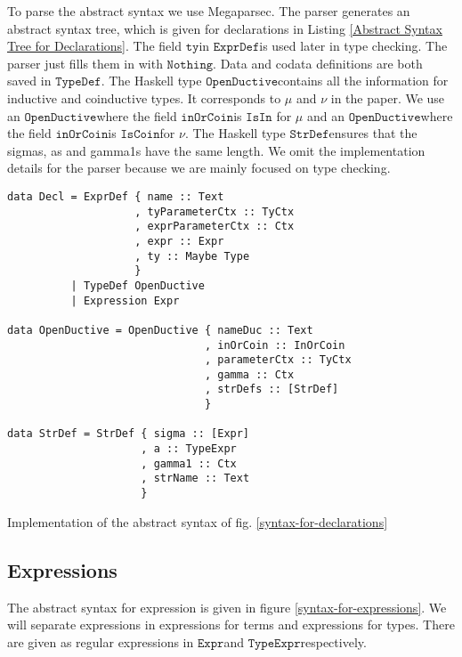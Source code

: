 \documentclass[a4paper,cleardoubleempty,BCOR1cm]{scrbook}
\begin{document}
To parse the abstract syntax we use Megaparsec. The parser generates an
abstract syntax tree, which is given for declarations in Listing
\ref{Abstract Syntax Tree for Declarations}. The field $\mathtt{ty}$\;in $\mathtt{ExprDef}$\;is used later in
type checking. The parser just fills them in with $\mathtt{Nothing}$. Data and codata
definitions are both saved in $\mathtt{TypeDef}$. The Haskell type $\mathtt{OpenDuctive}$\;contains all the
information for inductive and coinductive types. It corresponds to \(\mu\) and
\(\nu\) in the paper. We use an $\mathtt{OpenDuctive}$\;where the field $\mathtt{inOrCoin}$\;is $\mathtt{IsIn}$
for \(\mu\) and an $\mathtt{OpenDuctive}$\;where the field $\mathtt{inOrCoin}$\;is $\mathtt{IsCoin}$\;for
\(\nu\).  The Haskell type $\mathtt{StrDef}$\;ensures that the sigmas, as and gamma1s have the
same length.  We omit the implementation details for the parser because we
are mainly focused on type checking.

\begin{listing}[htbp]
\begin{verbatim}
data Decl = ExprDef { name :: Text
                    , tyParameterCtx :: TyCtx
                    , exprParameterCtx :: Ctx
                    , expr :: Expr
                    , ty :: Maybe Type
                    }
          | TypeDef OpenDuctive
          | Expression Expr

data OpenDuctive = OpenDuctive { nameDuc :: Text
                               , inOrCoin :: InOrCoin
                               , parameterCtx :: TyCtx
                               , gamma :: Ctx
                               , strDefs :: [StrDef]
                               }

data StrDef = StrDef { sigma :: [Expr]
                     , a :: TypeExpr
                     , gamma1 :: Ctx
                     , strName :: Text
                     }
\end{verbatim}
\caption{\label{Abstract Syntax Tree for Declarations}
Implementation of the abstract syntax of fig. \ref{syntax-for-declarations}}
\end{listing}
\subsection{Expressions}
\label{sec:org07afe58}
The abstract syntax for expression is given in figure \ref{syntax-for-expressions}.
We will separate expressions in expressions for terms and expressions for
types.  There are given as regular expressions in $\mathtt{Expr}$\;and $\mathtt{TypeExpr}$\;respectively.
\end{document}
